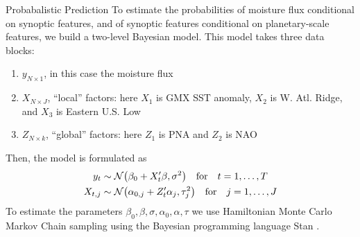 \begin{block}{Probabalistic Prediction}
    To estimate the  probabilities of moisture flux conditional on synoptic features, and of synoptic features conditional on planetary-scale features, we build a two-level Bayesian model.
    This model takes three data blocks:
    \begin{enumerate}
        \item $y_{N \times 1}$, in this case the moisture flux
        \item $X_{N \times J}$, ``local'' factors: here $X_1$ is GMX SST anomaly, $X_2$ is W. Atl. Ridge, and $X_3$ is Eastern U.S. Low
        \item $Z_{N \times k}$, ``global'' factors: here $Z_1$ is PNA and $Z_2$ is NAO
    \end{enumerate}
    Then, the model is formulated as
    \begin{align}
        y_t & \sim \normal \qty(\beta_0 + X'_t \beta, \sigma^2) \qqtext{for} t = 1, \ldots, T \label{eq:yX}\\
        X_{t,j} &\sim \normal \qty(\alpha_{0,j} + Z'_t \alpha_j, \tau_j^2) \qqtext{for} j = 1, \ldots, J \label{eq:XZ}
    \end{align}
    To estimate the parameters $\beta_0, \beta, \sigma, \alpha_0, \alpha, \tau$ we use Hamiltonian Monte Carlo Markov Chain sampling using the Bayesian programming language Stan \cite{Carpenter2016}.
\end{block}
